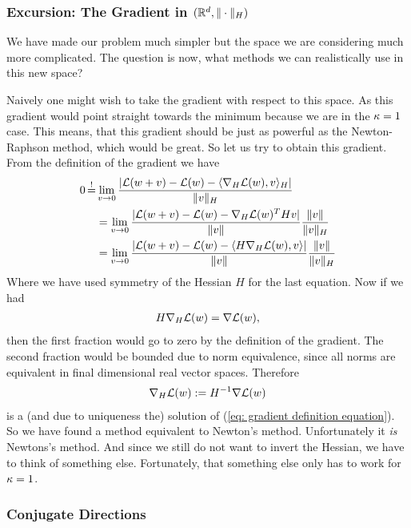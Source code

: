 \subsubsection{Excursion: The Gradient in \((\mathbb{R}^d, \|\cdot\|_H)\)}

We have made our problem much simpler but the space we are considering much
more complicated. The question is now, what methods we can realistically use
in this new space?

Naively one might wish to take the gradient with respect to this space. As this
gradient would point straight towards the minimum because we are in the
\(\kappa=1\) case. This means, that this gradient should be just as
powerful as the Newton-Raphson method, which would be great. So let us try to
obtain this gradient. From the definition of the gradient we have
\begin{align}
	\label{eq: gradient definition equation}
	0\xeq{!}&\lim_{v\to 0}\frac{
		|\Loss(\weights + v) - \Loss(\weights) - \langle \nabla_H\Loss(\weights), v\rangle_H |
	}{\|v\|_H}\\
	\nonumber
	&=\lim_{v\to 0}\frac{
		|\Loss(\weights + v) - \Loss(\weights) -  \nabla_H\Loss(\weights)^T H v |
	}{\|v\|}
	\frac{\|v\|}{\|v\|_H}\\
	\nonumber
	&=\lim_{v\to 0}\frac{
		|\Loss(\weights + v) - \Loss(\weights) -  \langle H\nabla_H\Loss(\weights), v\rangle |
	}{\|v\|}
	\frac{\|v\|}{\|v\|_H}
\end{align}
Where we have used symmetry of the Hessian \(H\) for the last equation. Now if
we had
\begin{align*}
	H \nabla_H \mathcal{L}(w) = \nabla\mathcal{L}(w),
\end{align*}
then the first fraction would go to zero by the definition of the gradient.
The second fraction would be bounded due to norm equivalence, since all norms
are equivalent in final dimensional real vector spaces. Therefore
\begin{align*}
	\nabla_H \mathcal{L}(w) := H^{-1}\nabla\mathcal{L}(w)
\end{align*}
is a (and due to uniqueness the) solution of (\ref{eq: gradient definition
equation}). So we have found a method equivalent to Newton's method.
Unfortunately it \emph{is} Newtons's method. And since we still do not want
to invert the Hessian, we have to think of something else. Fortunately, that
something else only has to work for \(\kappa=1\).

\subsubsection{Conjugate Directions}

